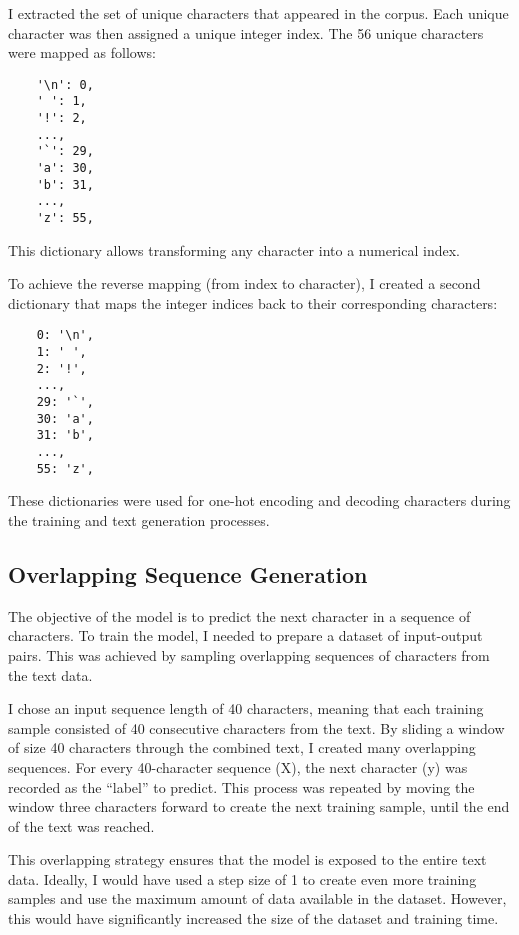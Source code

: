\documentclass{article}
\begin{document}
I extracted the set of unique characters that appeared in the corpus. Each unique character was then assigned a unique integer index. The 56 unique characters were mapped as follows:

\begin{lstlisting}
    '\n': 0,
    ' ': 1,
    '!': 2,
    ...,
    '`': 29,
    'a': 30,
    'b': 31,
    ...,
    'z': 55,
\end{lstlisting}

This dictionary allows transforming any character into a numerical index.

To achieve the reverse mapping (from index to character), I created a second dictionary that maps the integer indices back to their corresponding characters:

\begin{lstlisting}
    0: '\n',
    1: ' ',
    2: '!',
    ...,
    29: '`',
    30: 'a',
    31: 'b',
    ...,
    55: 'z',
\end{lstlisting}

These dictionaries were used for one-hot encoding and decoding characters during the training and text generation processes.

\subsection{Overlapping Sequence Generation}

The objective of the model is to predict the next character in a sequence of characters. To train the model, I needed to prepare a dataset of input-output pairs. This was achieved by sampling overlapping sequences of characters from the text data.

I chose an input sequence length of 40 characters, meaning that each training sample consisted of 40 consecutive characters from the text. By sliding a window of size 40 characters through the combined text, I created many overlapping sequences. For every 40-character sequence (X), the next character (y) was recorded as the ``label'' to predict. This process was repeated by moving the window three characters forward to create the next training sample, until the end of the text was reached.

This overlapping strategy ensures that the model is exposed to the entire text data. Ideally, I would have used a step size of 1 to create even more training samples and use the maximum amount of data available in the dataset. However, this would have significantly increased the size of the dataset and training time.
\end{document}
